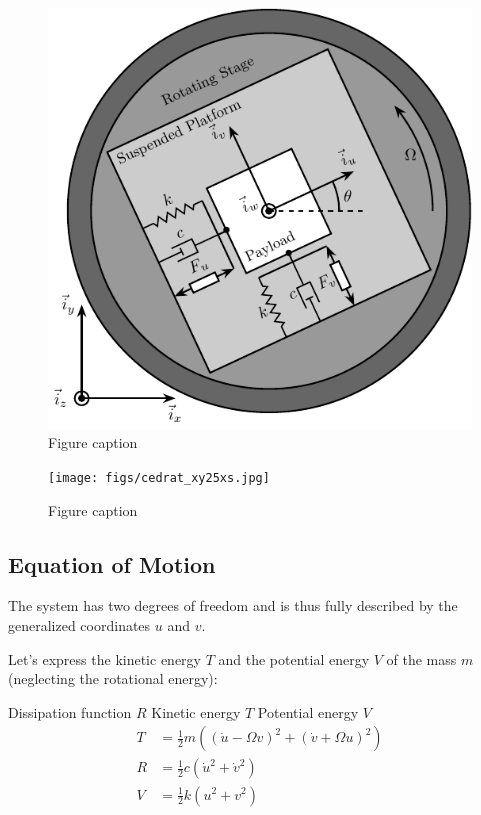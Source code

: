 \documentclass{ISMA_USD2020}
\begin{document}
\begin{figure}[htbp]
\centering
\includegraphics[scale=1]{figs/system.pdf}
\caption{\label{fig:rotating_xy_platform}Figure caption}
\end{figure}


\begin{figure}[htbp]
\centering
\texttt{[image: figs/cedrat\_xy25xs.jpg]}
\caption{\label{fig:cedrat_xy25xs}Figure caption}
\end{figure}

\subsection{Equation of Motion}
\label{sec:orgb1836d5}
The system has two degrees of freedom and is thus fully described by the generalized coordinates \(u\) and \(v\).

Let's express the kinetic energy \(T\) and the potential energy \(V\) of the mass \(m\) (neglecting the rotational energy):

Dissipation function \(R\)
Kinetic energy \(T\)
Potential energy \(V\)
\begin{subequations}
  \begin{align}
    T & = \frac{1}{2} m \left( \left( \dot{u} - \Omega v \right)^2 + \left( \dot{v} + \Omega u \right)^2 \right) \\
    R & = \frac{1}{2} c \left( \dot{u}^2 + \dot{v}^2 \right) \\
    V & = \frac{1}{2} k \left( u^2 + v^2 \right)
  \end{align}
\end{subequations}
\end{document}
